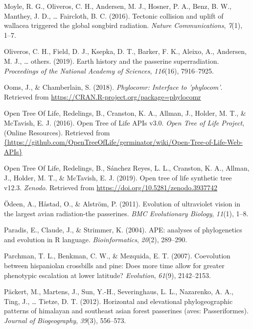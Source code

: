 \documentclass[english,man]{apa6}
\begin{document}
\leavevmode\hypertarget{ref-moyle2016tectonic}{}%
Moyle, R. G., Oliveros, C. H., Andersen, M. J., Hosner, P. A., Benz, B. W., Manthey, J. D., \ldots{} Faircloth, B. C. (2016). Tectonic collision and uplift of wallacea triggered the global songbird radiation. \emph{Nature Communications}, \emph{7}(1), 1--7.

\leavevmode\hypertarget{ref-oliveros2019earth}{}%
Oliveros, C. H., Field, D. J., Ksepka, D. T., Barker, F. K., Aleixo, A., Andersen, M. J., \ldots{} others. (2019). Earth history and the passerine superradiation. \emph{Proceedings of the National Academy of Sciences}, \emph{116}(16), 7916--7925.

\leavevmode\hypertarget{ref-Ooms2018}{}%
Ooms, J., \& Chamberlain, S. (2018). \emph{Phylocomr: Interface to 'phylocom'}. Retrieved from \url{https://CRAN.R-project.org/package=phylocomr}

\leavevmode\hypertarget{ref-opentreeAPIs}{}%
Open Tree Of Life, Redelings, B., Cranston, K. A., Allman, J., Holder, M. T., \& McTavish, E. J. (2016). Open Tree of Life APIs v3.0. \emph{Open Tree of Life Project}, (Online Resources). Retrieved from \href{\%7Bhttps://github.com/OpenTreeOfLife/germinator/wiki/Open-Tree-of-Life-Web-APIs\%7D}{\{https://github.com/OpenTreeOfLife/germinator/wiki/Open-Tree-of-Life-Web-APIs\}}

\leavevmode\hypertarget{ref-opentreeoflife2019synth}{}%
Open Tree Of Life, Redelings, B., Sánchez Reyes, L. L., Cranston, K. A., Allman, J., Holder, M. T., \& McTavish, E. J. (2019). Open tree of life synthetic tree v12.3. \emph{Zenodo}. Retrieved from \url{https://doi.org/10.5281/zenodo.3937742}

\leavevmode\hypertarget{ref-odeen2011evolution}{}%
Ödeen, A., Håstad, O., \& Alström, P. (2011). Evolution of ultraviolet vision in the largest avian radiation-the passerines. \emph{BMC Evolutionary Biology}, \emph{11}(1), 1--8.

\leavevmode\hypertarget{ref-paradis2004}{}%
Paradis, E., Claude, J., \& Strimmer, K. (2004). APE: analyses of phylogenetics and evolution in R language. \emph{Bioinformatics}, \emph{20}(2), 289--290.

\leavevmode\hypertarget{ref-parchman2007coevolution}{}%
Parchman, T. L., Benkman, C. W., \& Mezquida, E. T. (2007). Coevolution between hispaniolan crossbills and pine: Does more time allow for greater phenotypic escalation at lower latitude? \emph{Evolution}, \emph{61}(9), 2142--2153.

\leavevmode\hypertarget{ref-packert2012horizontal}{}%
Päckert, M., Martens, J., Sun, Y.-H., Severinghaus, L. L., Nazarenko, A. A., Ting, J., \ldots{} Tietze, D. T. (2012). Horizontal and elevational phylogeographic patterns of himalayan and southeast asian forest passerines (aves: Passeriformes). \emph{Journal of Biogeography}, \emph{39}(3), 556--573.
\end{document}
